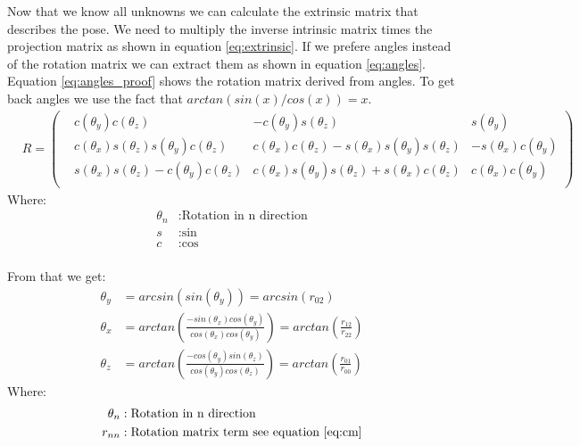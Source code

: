 \documentclass[11pt,a4paper,titlepage,oneside]{report}
\begin{document}
Now that we know all unknowns we can calculate the extrinsic matrix that describes the pose. We need to multiply the inverse intrinsic matrix times the projection matrix as shown in equation \ref{eq:extrinsic}. If we prefere angles instead of the rotation matrix we can extract them as shown in equation \ref{eq:angles}. Equation \ref{eq:angles_proof} shows the rotation matrix derived from angles. To get back angles we use the fact that $arctan(sin(x)/cos(x))=x$.
\begin{equation}\label{eq:angles_proof}
\begin{aligned}
	&R=\begin{pmatrix}
		&c(\theta_y)c(\theta_z) & -c(\theta_y)s(\theta_z) & s(\theta_y)\\
		&c(\theta_x)s(\theta_z)s(\theta_y)c(\theta_z) & c(\theta_x)c(\theta_z)-s(\theta_x)s(\theta_y)s(\theta_z) & -s(\theta_x)c(\theta_y)\\
		&s(\theta_x)s(\theta_z)-c(\theta_y)c(\theta_z) & c(\theta_x)s(\theta_y)s(\theta_z)+s(\theta_x)c(\theta_z) &	c(\theta_x)c(\theta_y)\\
	\end{pmatrix}
\end{aligned}
\end{equation}
Where:
\begin{align*}
	\theta_n	&: \text{Rotation in n direction}\\
	s				  &: \text{sin}\\
	c				  &: \text{cos}\\
\end{align*}

From that we get:
\begin{equation}\label{eq:angles}
\begin{aligned}
	\theta_y &= arcsin(sin(\theta_y)) = arcsin(r_{02})\\
	\theta_x &= arctan(\frac{-sin(\theta_x)cos(\theta_y)}{cos(\theta_x)cos(\theta_y)}) = arctan(\frac{r_{12}}{r_{22}})\\
	\theta_z &= arctan(\frac{-cos(\theta_y)sin(\theta_z)}{cos(\theta_y)cos(\theta_z)}) = arctan(\frac{r_{01}}{r_{00}}) 
\end{aligned}
\end{equation}
Where:
\begin{align*}
	\theta_n	&: \text{Rotation in n direction}\\
	r_{nn}	  &: \text{Rotation matrix term see equation \ref{eq:cm}}\\
\end{align*}
\end{document}
